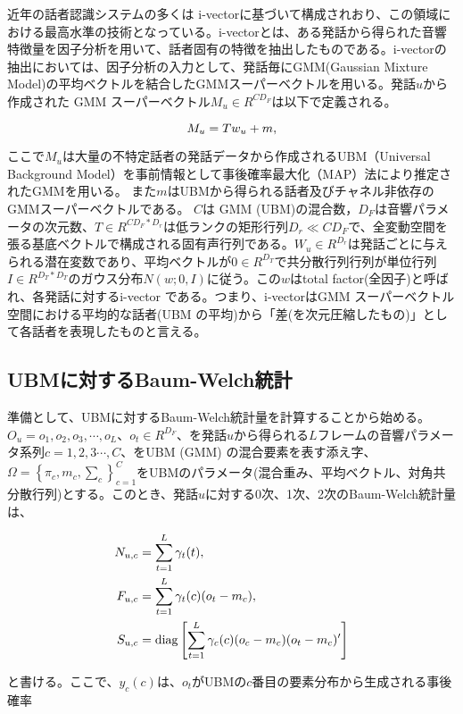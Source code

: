 近年の話者認識システムの多くは i-vector\cite{iv}に基づいて構成されおり、この領域における最高水準の技術となっている。i-vectorとは、ある発話から得られた音響特徴量を因子分析を用いて、話者固有の特徴を抽出したものである。i-vectorの抽出においては、因子分析の入力として、発話毎にGMM(Gaussian Mixture Model)の平均ベクトルを結合したGMMスーパーベクトルを用いる。発話$u$から作成された GMM スーパーベクトル$M_u∈R^{CD_F}$は以下で定義される。

\begin{equation}
M_u=T w_u + m, \notag
\end{equation}

ここで$M_u$は大量の不特定話者の発話データから作成されるUBM（Universal Background Model）を事前情報として事後確率最大化（MAP）法により推定されたGMMを用いる。
また$m$はUBMから得られる話者及びチャネル非依存のGMMスーパーベクトルである。
$C$は GMM (UBM)の混合数，$D_F$は音響パラメータの次元数、$T∈R^{CD_F*D_r}$は低ランクの矩形行列$D_r \ll CD_F$で、全変動空間を張る基底ベクトルで構成される固有声行列である。$W_u \in R^{D_r}$は発話ごとに与えられる潜在変数であり、平均ベクトルが$0 \in R^{D_T}$で共分散行列行列が単位行列$I \in R^{D_T*D_T}$のガウス分布$N(w ; 0,I)$に従う。この$w$はtotal factor(全因子)と呼ばれ、各発話に対するi-vector である。つまり、i-vectorはGMM スーパーベクトル空間における平均的な話者(UBM の平均)から「差(を次元圧縮したもの)」として各話者を表現したものと言える。

\subsection{UBMに対するBaum-Welch統計}
準備として、UBMに対するBaum-Welch統計量を計算することから始める。
$O_u={o_1,o_2,o_3,\cdots,o_L}$、$o_t\in R^{D_F}$、を発話$u$から得られる$L$フレームの音響パラメータ系列$c=1,2,3\cdots,C$、をUBM (GMM) の混合要素を表す添え字、$\Omega=\left\{\pi_c,m_c,\sum_{c}\right\}_{c=1}^{C}$をUBMのパラメータ(混合重み、平均ベクトル、対角共分散行列)とする。このとき、発話$u$に対する0次、1次、2次のBaum-Welch統計量は、

\begin{align}
N_{u,c} &=\sum_{t=1}^{L}\gamma_t(t), \notag \\
F_{u,c} &=\sum_{t=1}^{L}\gamma_t(c)(o_t-m_c), \notag \\
S_{u,c} &=\diag\left[\sum_{t=1}^L\gamma_c(c)(o_c-m_c)(o_t-m_c)^\prime\right] \notag 
\end{align}



と書ける。ここで、$y_c(c)$は、$o_t$がUBMの$c$番目の要素分布から生成される事後確率

